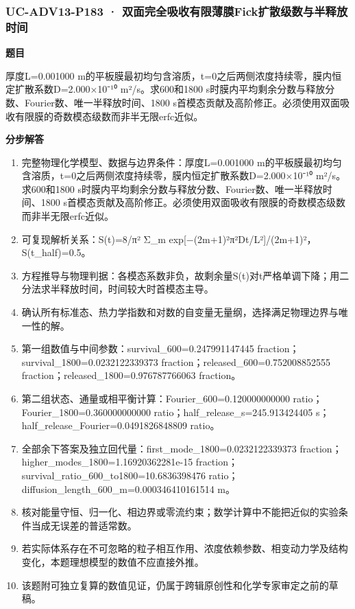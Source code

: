 \documentclass[UTF8,11pt,a4paper]{ctexart}
\begin{document}
\subsubsection*{UC-ADV13-P183 · 双面完全吸收有限薄膜Fick扩散级数与半释放时间}
\noindent\textbf{题目}\par
厚度L=0.001000 m的平板膜最初均匀含溶质，t=0之后两侧浓度持续零，膜内恒定扩散系数D=2.000×10⁻¹⁰ m²/s。求600和1800 s时膜内平均剩余分数与释放分数、Fourier数、唯一半释放时间、1800 s首模态贡献及高阶修正。必须使用双面吸收有限膜的奇数模态级数而非半无限erfc近似。\par
\medskip\noindent\textbf{分步解答}
\begin{enumerate}
\item 完整物理化学模型、数据与边界条件：厚度L=0.001000 m的平板膜最初均匀含溶质，t=0之后两侧浓度持续零，膜内恒定扩散系数D=2.000×10⁻¹⁰ m²/s。求600和1800 s时膜内平均剩余分数与释放分数、Fourier数、唯一半释放时间、1800 s首模态贡献及高阶修正。必须使用双面吸收有限膜的奇数模态级数而非半无限erfc近似。
\item 可复现解析关系：S(t)=8/π² Σ\_m exp[−(2m+1)²π²Dt/L²]/(2m+1)²，S(t\_half)=0.5。
\item 方程推导与物理判据：各模态系数非负，故剩余量S(t)对t严格单调下降；用二分法求半释放时间，时间较大时首模态主导。
\item 确认所有标准态、热力学指数和对数的自变量无量纲，选择满足物理边界与唯一性的解。
\item 第一组数值与中间参数：survival\_600=0.247991147445 fraction；survival\_1800=0.0232122339373 fraction；released\_600=0.752008852555 fraction；released\_1800=0.976787766063 fraction。
\item 第二组状态、通量或相平衡计算：Fourier\_600=0.120000000000 ratio；Fourier\_1800=0.360000000000 ratio；half\_release\_s=245.913424405 s；half\_release\_Fourier=0.0491826848809 ratio。
\item 全部余下答案及独立回代量：first\_mode\_1800=0.0232122339373 fraction；higher\_modes\_1800=1.16920362281e-15 fraction；survival\_ratio\_600\_to1800=10.6836398476 ratio；diffusion\_length\_600\_m=0.000346410161514 m。
\item 核对能量守恒、归一化、相边界或零流约束；数学计算中不能把近似的实验条件当成无误差的普适常数。
\item 若实际体系存在不可忽略的粒子相互作用、浓度依赖参数、相变动力学及结构变化，本题理想模型的数值不应直接外推。
\item 该题附可独立复算的数值见证，仍属于跨辑原创性和化学专家审定之前的草稿。
\end{enumerate}
\end{document}
